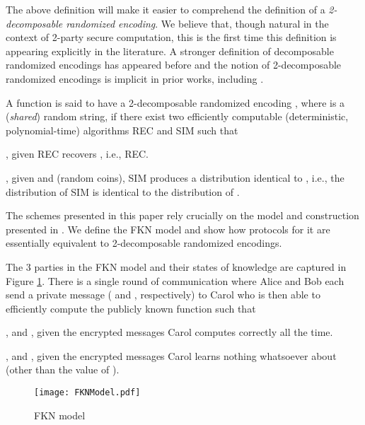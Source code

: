The above definition will make  it easier to comprehend the definition
of a {\em 2-decomposable randomized encoding}. We believe that, though
natural  in the  context of  2-party secure  computation, this  is the
first   time  this   definition   is  appearing   explicitly  in   the
literature. A stronger definition of decomposable randomized encodings
has  appeared   before  \cite{IKOS08,   IKOS09}  and  the   notion  of
2-decomposable  randomized  encodings  is  implicit  in  prior  works,
including \cite{FKN94}.

\begin{definition} 
\label{def:2-decomp}
A  function   is  said  to  have  a 2-decomposable  randomized
encoding , where  is
a  ({\em  shared})  random  string,  if there  exist  two  efficiently
computable  (deterministic, polynomial-time)  algorithms  REC and  SIM
such that

    ,    given
  REC recovers ,
i.e., REC.

 ,  given  and  (random
coins),     SIM    produces     a     distribution    identical     to
, i.e., the distribution
of   SIM   is   identical   to   the  distribution   of
.
\end{definition}

The schemes  presented in this paper  rely crucially on  the model and
construction presented  in \cite{FKN94}. We  define the FKN  model and
show how protocols for it are essentially equivalent to 2-decomposable
randomized encodings.

\begin{definition}
\label{def:FKNModel}
The 3  parties in the FKN  model and their states  of knowledge are
captured  in Figure  \ref{fig:FKNModel}. There  is a  single  round of
communication  where  Alice  and  Bob  each  send  a  private  message
( and  , respectively)  to Carol who  is then  able to
efficiently compute the publicly known function  such that

  ,  and  ,  given  the
encrypted messages  Carol computes  correctly
all the time.

  , and ,  given the encrypted
messages  Carol learns nothing whatsoever about 
(other than the value of ).
\end{definition}

\begin{figure}
\centering
\texttt{[image: FKNModel.pdf]}
\vspace{-.5in}
\caption{FKN model}
\label{fig:FKNModel}
\end{figure}

